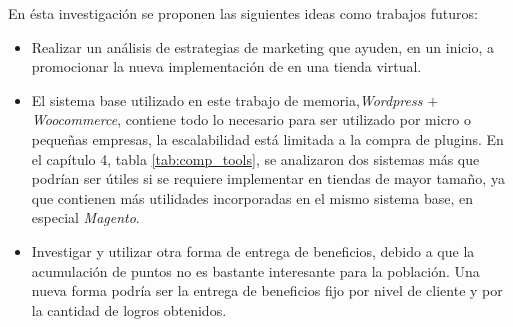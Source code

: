 En ésta investigación se proponen las siguientes ideas como trabajos futuros:


\begin{itemize}

\item Realizar un análisis de estrategias de marketing que ayuden, en un inicio, a promocionar
la nueva implementación de {\gam} en una tienda virtual.

\item El sistema base utilizado en este trabajo de memoria,\emph{Wordpress $+$ Woocommerce}, contiene
todo lo necesario para ser utilizado por micro o pequeñas empresas, la escalabilidad está limitada
a la compra de plugins. En el capítulo 4, tabla \ref{tab:comp_tools}, se analizaron dos sistemas más
que podrían ser útiles si se requiere implementar {\gam} en tiendas de mayor tamaño, ya que contienen
más utilidades incorporadas en el mismo sistema base, en especial \emph{Magento}.

\item Investigar y utilizar otra forma de entrega de beneficios, debido a que la
acumulación de puntos no es bastante interesante para la población. Una nueva forma podría ser la entrega
de beneficios fijo por nivel de cliente y por la cantidad de logros obtenidos.

\end{itemize}



